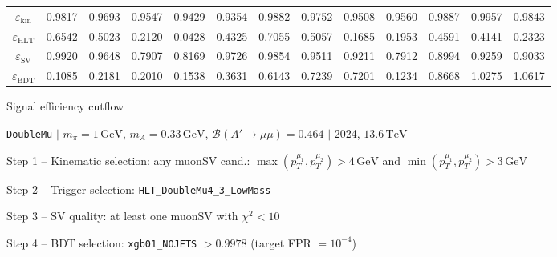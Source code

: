 \documentclass[10pt,a4paper]{article}
\begin{document}
\begin{landscape}
{\begin{tabular}{c|cccc|cccc|cccc}
\midrule
$\varepsilon_{\mathrm{kin}}$ & 0.9817 & 0.9693 & 0.9547 & 0.9429 & 0.9354 & 0.9882 & 0.9752 & 0.9508 & 0.9560 & 0.9887 & 0.9957 & 0.9843\\
$\varepsilon_{\mathrm{HLT}}$ & 0.6542 & 0.5023 & 0.2120 & 0.0428 & 0.4325 & 0.7055 & 0.5057 & 0.1685 & 0.1953 & 0.4591 & 0.4141 & 0.2323\\
$\varepsilon_{\mathrm{SV}}$ & 0.9920 & 0.9648 & 0.7907 & 0.8169 & 0.9726 & 0.9854 & 0.9511 & 0.9211 & 0.7912 & 0.8994 & 0.9259 & 0.9033\\
$\varepsilon_{\mathrm{BDT}}$ & 0.1085 & 0.2181 & 0.2010 & 0.1538 & 0.3631 & 0.6143 & 0.7239 & 0.7201 & 0.1234 & 0.8668 & 1.0275 & 1.0617\\
\bottomrule
\end{tabular}}

\end{landscape}
\clearpage

{\large Signal efficiency cutflow

 \texttt{DoubleMu} $|$ $m_{\pi}=1\,\mathrm{GeV}$, $m_{A}=0.33\,\mathrm{GeV}$, $\mathcal{B}(A'\!\to\!\mu\mu)=0.464$ $|$ 2024, $13.6\,\mathrm{TeV}$}

\vspace{0.8em}

Step 1 -- Kinematic selection: any muonSV cand.: $\max(p_T^{\mu_1},p_T^{\mu_2}){>}4\,\mathrm{GeV}$ and $\min(p_T^{\mu_1},p_T^{\mu_2}){>}3\,\mathrm{GeV}$

Step 2 -- Trigger selection: \texttt{HLT\_DoubleMu4\_3\_LowMass}

Step 3 -- SV quality: at least one muonSV with $\chi^2<10$

Step 4 -- BDT selection: \texttt{xgb01\_NOJETS} $>0.9978$ (target FPR $=10^{-4}$)

\vspace{0.8em}
\end{document}
